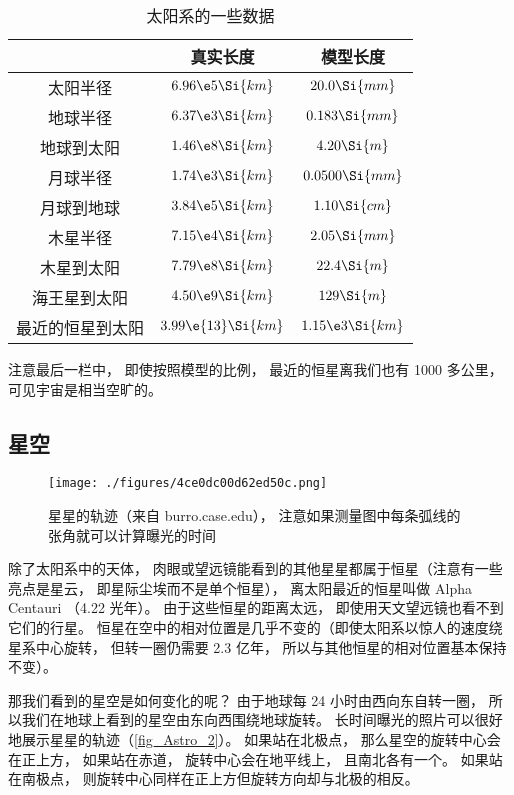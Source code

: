 \begin{table}[ht]
\centering
\caption{太阳系的一些数据}\label{tab_Astro_1}
\begin{tabular}{|c|c|c|}
\hline
 & 真实长度 & 模型长度 \\
\hline
太阳半径 & $6.96\e5 \Si{km}$ & $20.0 \Si{mm}$\\
\hline
地球半径 &  $6.37\e3 \Si{km}$ & $0.183 \Si{mm}$\\
\hline
地球到太阳  &  $1.46\e8 \Si{km}$ & $4.20 \Si{m}$\\
\hline
月球半径 & $1.74\e3 \Si{km}$ & $0.0500 \Si{mm}$\\
\hline
月球到地球 & $3.84\e5 \Si{km}$ &  $1.10 \Si{cm}$\\
\hline
木星半径 & $7.15\e4 \Si{km}$ & $2.05 \Si{mm}$\\
\hline
木星到太阳 & $7.79\e8 \Si{km}$ & $22.4 \Si{m}$\\
\hline
海王星到太阳 & $4.50\e9 \Si{km}$ & $129 \Si{m}$\\
\hline
最近的恒星到太阳 & $3.99\e{13} \Si{km}$ &  $1.15\e3 \Si{km}$\\
\hline
\end{tabular}
\end{table}
注意最后一栏中， 即使按照模型的比例， 最近的恒星离我们也有 1000 多公里， 可见宇宙是相当空旷的。

\subsection{星空}

\begin{figure}[ht]
\centering
\texttt{[image: ./figures/4ce0dc00d62ed50c.png]}
\caption{星星的轨迹（来自 burro.case.edu）， 注意如果测量图中每条弧线的张角就可以计算曝光的时间} \label{fig_Astro_2}
\end{figure}

除了太阳系中的天体， 肉眼或望远镜能看到的其他星星都属于恒星（注意有一些亮点是星云， 即星际尘埃而不是单个恒星）， 离太阳最近的恒星叫做 Alpha Centauri （4.22 光年）。 由于这些恒星的距离太远， 即使用天文望远镜也看不到它们的行星。 恒星在空中的相对位置是几乎不变的（即使太阳系以惊人的速度绕星系中心旋转， 但转一圈仍需要 2.3 亿年， 所以与其他恒星的相对位置基本保持不变）。

那我们看到的星空是如何变化的呢？ 由于地球每 24 小时由西向东自转一圈， 所以我们在地球上看到的星空由东向西围绕地球旋转。 长时间曝光的照片可以很好地展示星星的轨迹（\autoref{fig_Astro_2}）。 如果站在北极点， 那么星空的旋转中心会在正上方， 如果站在赤道， 旋转中心会在地平线上， 且南北各有一个。 如果站在南极点， 则旋转中心同样在正上方但旋转方向却与北极的相反。

